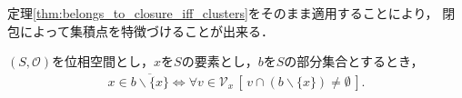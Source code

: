 	定理\ref{thm:belongs_to_closure_iff_clusters}をそのまま適用することにより，
	閉包によって集積点を特徴づけることが出来る．
	\begin{screen}
		\begin{thm}[集積点は閉包に捕らえられる]
			$(S,\mathscr{O})$を位相空間とし，$x$を$S$の要素とし，$b$を$S$の部分集合とするとき，
			\begin{align}
				x \in \overline{b \backslash \{x\}} \Longleftrightarrow
				\forall v \in \mathcal{V}_{x}\, \left[\, v \cap (b \backslash \{x\}) \neq \emptyset\, \right].
			\end{align}
		\end{thm}
	\end{screen}